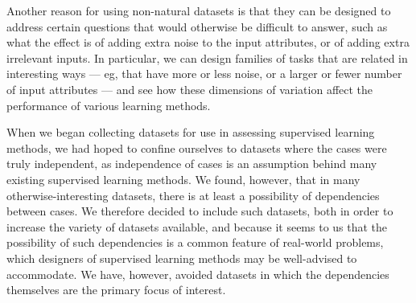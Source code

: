 Another reason for using non-natural datasets is that they can be
designed to address certain questions that would otherwise be
difficult to answer, such as what the effect is of adding extra noise
to the input attributes, or of adding extra irrelevant inputs.  In
particular, we can design families of tasks that are related in
interesting ways --- eg, that have more or less noise, or a larger or
fewer number of input attributes --- and see how these dimensions of
variation affect the performance of various learning methods.

When we began collecting datasets for use in assessing supervised
learning methods, we had hoped to confine ourselves to datasets
where the cases were truly independent, as independence of cases is an
assumption behind many existing supervised learning methods.  We
found, however, that in many otherwise-interesting datasets, there is
at least a possibility of dependencies between cases.  We therefore
decided to include such datasets, both in order to increase the
variety of datasets available, and because it seems to us that the
possibility of such dependencies is a common feature of real-world
problems, which designers of supervised learning methods may be
well-advised to accommodate.  We have, however, avoided datasets in 
which the dependencies themselves are the primary focus of interest.
